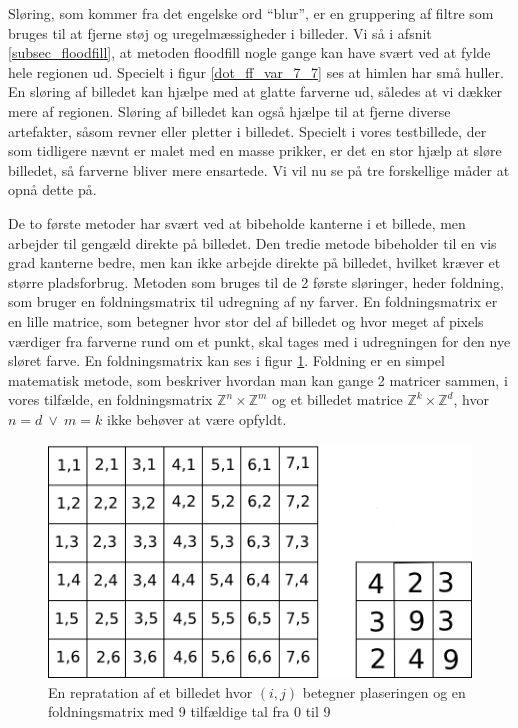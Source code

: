{
Sløring, som kommer fra det engelske ord ``blur'', er en gruppering af
filtre som bruges til at fjerne støj og uregelmæssigheder i billeder. Vi
så i afsnit \ref{subsec_floodfill}, at metoden floodfill nogle gange kan
have svært ved at fylde hele regionen ud. Specielt i figur
\ref{dot_ff_var_7_7} ses at himlen har små huller. En sløring af
billedet kan hjælpe med at glatte farverne ud, således at vi dækker mere
af regionen. Sløring af billedet kan også hjælpe til at fjerne diverse
artefakter, såsom revner eller pletter i billedet. Specielt i
vores testbillede, der som tidligere nævnt er malet med en masse
prikker, er det en stor hjælp at sløre billedet, så farverne bliver mere
ensartede. Vi vil nu se på tre forskellige måder at opnå dette på.

De to første metoder har svært ved at bibeholde kanterne i et billede,
men arbejder til gengæld direkte på billedet. Den tredie metode
bibeholder til en vis grad kanterne bedre, men kan ikke arbejde direkte
på billedet, hvilket kræver et større pladsforbrug. Metoden som bruges
til de 2 første sløringer, heder foldning, som bruger en foldningsmatrix til
udregning af ny farver. En foldningsmatrix er en lille matrice, som betegner hvor
stor del af billedet og hvor meget af pixels værdiger fra farverne rund
om et punkt, skal tages med i udregningen for den nye sløret farve. En
foldningsmatrix kan ses i figur \ref{Foldning}. Foldning er en simpel matematisk
metode, som beskriver hvordan man kan gange 2 matricer sammen, i vores
tilfælde, en foldningsmatrix $\mathbb{Z}^{n}\times{} \mathbb{Z}^{m}$ og et
billedet matrice $\mathbb{Z}^{k}\times{} \mathbb{Z}^{d}$, hvor $n = d
~\vee~ m = k$ ikke behøver at være opfyldt.

\begin{figure}[h]
	\begin{center}
		\includegraphics[scale=1,angle=0]{afsnit/vores_implementation/billeder/sloering/convolution}
	\end{center}
	\caption[]{En repratation af et billedet hvor $(i,j)$ betegner plaseringen og en foldningsmatrix med 9 tilfældige tal fra 0 til 9}
	\label{Foldning}
\end{figure}

}
